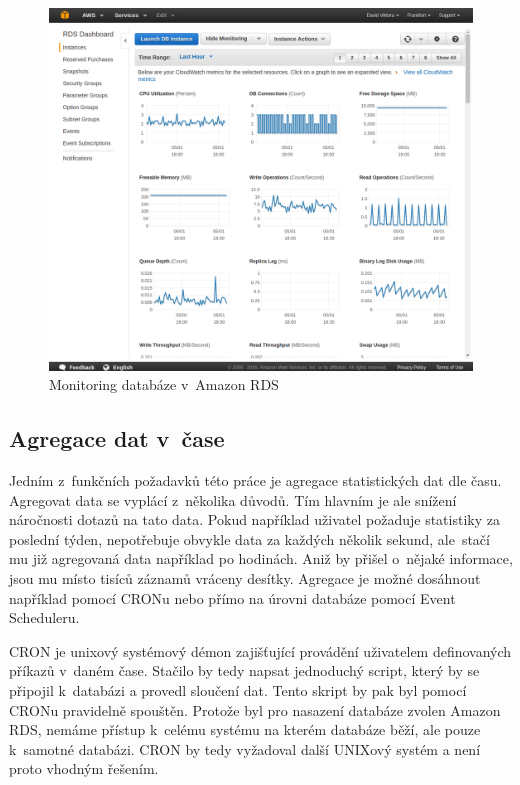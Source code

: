 \documentclass[thesis=B,czech]{FITthesis}[2012/06/26]
\begin{document}
\begin{figure}[h]
   	\centering
   	\includegraphics[width=1\textwidth]{images/aws-monitoring.png}
   	\caption{Monitoring databáze v~Amazon RDS}
   	\label{fig:aws_monitoring}
\end{figure}
	
\subsection{Agregace dat v~čase}
\label{agregace-dat}
	Jedním z~funkčních požadavků této práce je agregace statistických dat dle času. Agregovat data se vyplácí z~několika důvodů. Tím hlavním je ale snížení náročnosti dotazů na tato data. Pokud například uživatel požaduje statistiky za poslední týden, nepotřebuje obvykle data za každých několik sekund, ale~stačí mu již agregovaná data například po hodinách. Aniž by přišel o~nějaké informace, jsou mu místo tisíců záznamů vráceny desítky. Agregace je možné dosáhnout například pomocí CRONu nebo přímo na úrovni databáze pomocí Event Scheduleru. 
	
	CRON je unixový systémový démon zajišťující provádění uživatelem definovaných příkazů v~daném čase\cite{cron}. Stačilo by tedy napsat jednoduchý script, který by se připojil k~databázi a provedl sloučení dat. Tento skript by pak byl pomocí CRONu pravidelně spouštěn. Protože byl pro nasazení databáze zvolen Amazon RDS, nemáme přístup k~celému systému na kterém databáze běží, ale pouze k~samotné databázi. CRON by tedy vyžadoval další UNIXový systém a není proto vhodným řešením. 
	
\end{document}
